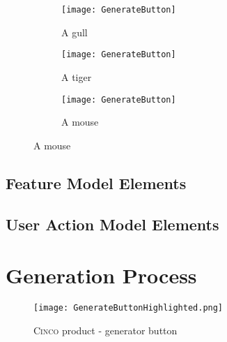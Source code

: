 \begin{figure}[H]
    \centering
    \begin{subfigure}[b]{0.3\textwidth}
        \centering
        \texttt{[image: GenerateButton]}
        \caption{A gull}
        \label{fig:gull}
    \end{subfigure}
    \begin{subfigure}[b]{0.3\textwidth}
        \centering
        \texttt{[image: GenerateButton]}
        \caption{A tiger}
        \label{fig:tiger}
    \end{subfigure}
    \begin{subfigure}[b]{0.3\textwidth}
        \centering
        \texttt{[image: GenerateButton]}
        \caption{A mouse}
        \label{fig:mouse}
    \end{subfigure}
\end{figure}


\subsection{Feature Model Elements}\label{sec:ConfElem}


\subsection{User Action Model Elements}\label{sec:FuncElem}


\section{Generation Process}\label{sec:GenProcess}

\begin{figure}[H]
    \centering
    \texttt{[image: GenerateButtonHighlighted.png]}
    \caption{\textsc{Cinco} product - generator button}
    \label{fig:genButton}
\end{figure}
